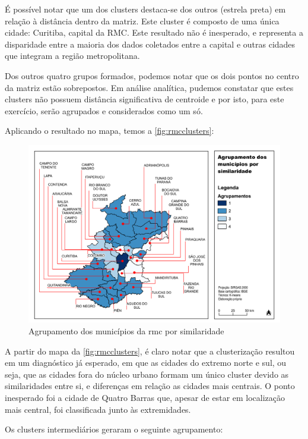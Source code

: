 	É possível notar que um dos clusters destaca-se dos outros (estrela preta) em relação à distância dentro da matriz. Este cluster é composto de uma única cidade: Curitiba, capital da RMC. Este resultado não é inesperado, e representa a disparidade entre a maioria dos dados coletados entre a capital e outras cidades que integram a região metropolitana.
	
	Dos outros quatro grupos formados, podemos notar que os dois pontos no centro da matriz estão sobrepostos. Em análise analítica, pudemos constatar que estes clusters não possuem distância significativa de centroide e por isto, para este exercício, serão agrupados e considerados como um só.
	
	Aplicando o resultado no mapa, temos a \autoref{fig:rmcclusters}:
	
	\begin{landscape}
		\begin{figure}
			\centering
			\caption{Agrupamento dos municípios da \glsdesc{rmc} por similaridade}
			\label{fig:rmcclusters}
			\includegraphics[width=0.85\linewidth]{../gis/produtos/RMC_clusters}
		\end{figure}
	\end{landscape}

	A partir do mapa da \autoref{fig:rmcclusters}, é claro notar que a clusterização resultou em um diagnóstico já esperado, em que as cidades do extremo norte e sul, ou seja, que as cidades fora do núcleo urbano formam um único cluster devido as similaridades entre si, e diferenças em relação as cidades mais centrais. O ponto inesperado foi a  cidade de Quatro Barras que, apesar de estar em localização mais central, foi classificada junto às extremidades.
	
	Os clusters intermediários geraram o seguinte agrupamento:
	
